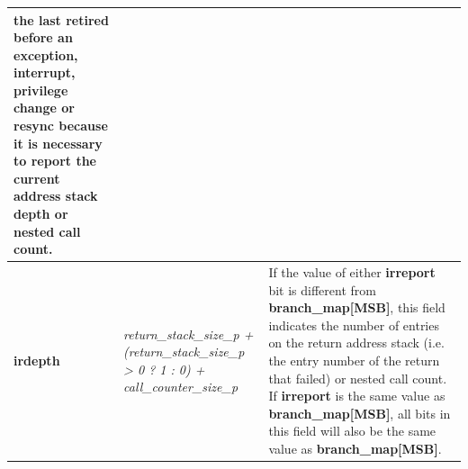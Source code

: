 \begin{table}[htp]
\begin{tabulary}{\textwidth}{|l|p{35mm}|p{90mm}|}
                the last retired before an exception, interrupt, privilege change or resync because it is necessary to report 
                the current address stack depth or nested call count. \\
    \hline
    \textbf{irdepth}	& \textit {return\_stack\_size\_p + (return\_stack\_size\_p > 0 ? 1 : 0) + call\_counter\_size\_p} & 
                If the value of either \textbf{irreport} bit is different from \textbf{branch\_map[MSB]}, this field 
				indicates the number of entries on the return address stack (i.e. the entry number of the return that
                failed) or nested call count.  If \textbf{irreport} is the same value as \textbf{branch\_map[MSB]}, 
                all bits in this field  will also be the same value as \textbf{branch\_map[MSB]}. \\
    \hline
  \end{tabulary}
\end{table}

